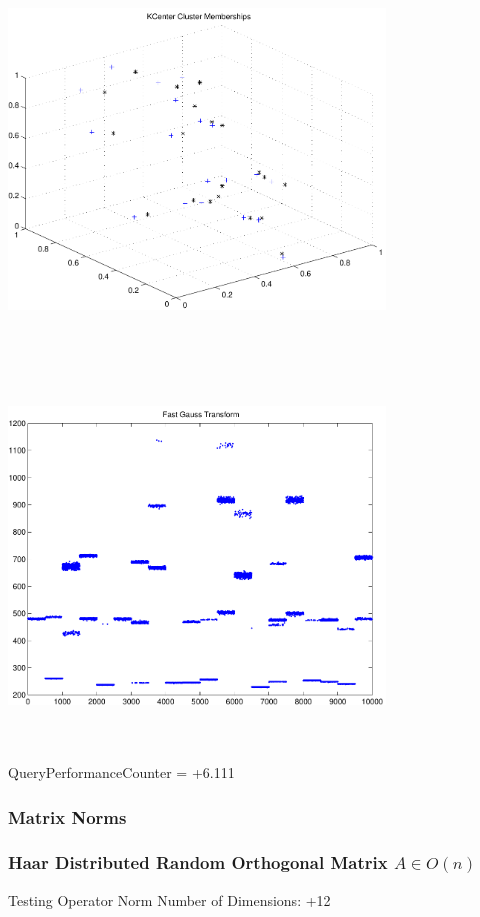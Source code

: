 \documentclass[9pt]{article}
\theoremstyle{plain}
\theoremstyle{definition}
\theoremstyle{remark}
\numberwithin{equation}{section}
\begin{document}
\includegraphics[width=10.0cm,height=10.0cm]{KCenterClusterMemberships_20_Centers.pdf}

\includegraphics[width=10.0cm,height=10.0cm]{FGT20_Centers.pdf}

QueryPerformanceCounter  =  +6.111
\subsubsection{Matrix Norms}
\subsubsection{Haar Distributed Random Orthogonal Matrix $A \in O(n)$}
 Testing Operator Norm
Number of Dimensions: +12
\end{document}
